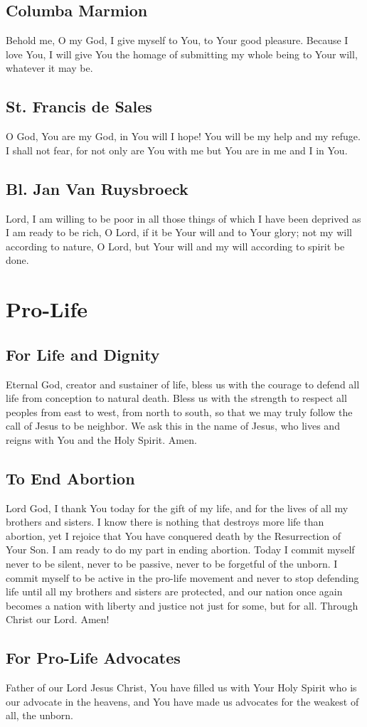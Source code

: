 \documentclass[12pt]{article}
\newcommand{\prayersection}[1]{\section{#1}}
\newcommand{\prayertitle}[1]{\subsection{#1}}
\begin{document}
\prayertitle{Columba Marmion}
Behold me, O my God, I give myself to You, to Your good pleasure.
Because I love You, I will give You the homage of submitting my whole being to Your will, whatever it may be.

\prayertitle{St. Francis de Sales}
O God, You are my God, in You will I hope!
You will be my help and my refuge.
I shall not fear, for not only are You with me but You are in me and I in You.
\newpage
\prayertitle{Bl. Jan Van Ruysbroeck}
Lord, I am willing to be poor in all those things of which I have been deprived as I am ready to be rich, O Lord, if it be Your will and to Your glory;
not my will according to nature, O Lord, but Your will and my will according to spirit be done.

\newpage

\prayersection{Pro-Life}
\prayertitle{For Life and Dignity}
Eternal God, creator and sustainer of life, bless us with the courage to defend all life from conception to natural death.
Bless us with the strength to respect all peoples from east to west, from north to south,
so that we may truly follow the call of Jesus to be neighbor.
We ask this in the name of Jesus, who lives and reigns with You and the Holy Spirit.
Amen.

\prayertitle{To End Abortion}
Lord God, I thank You today for the gift of my life, and for the lives of all my brothers and sisters.
I know there is nothing that destroys more life than abortion, yet I rejoice that You have conquered death by the Resurrection of Your Son. 
I am ready to do my part in ending abortion. Today I commit myself 
never to be silent, 
never to be passive, 
never to be forgetful of the unborn. 
I commit myself to be active in the pro-life movement and never to stop defending life until all my brothers and sisters are protected, and our nation once again becomes a nation with liberty and justice not just for some, but for all.
Through Christ our Lord. Amen!

\prayertitle{For Pro-Life Advocates}
Father of our Lord Jesus Christ,
You have filled us with Your Holy Spirit who is our advocate in the heavens, and You have made us advocates for the weakest of all, the unborn.
\end{document}
